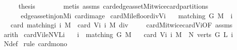 \begin{isabellebody}
%
\isadelimproof
%
\endisadelimproof
%
\isatagproof
{}\isamarkupfalse%
\ {\isacharminus}\isanewline
\ \ \isamarkupfalse%
\ {\isacharquery}thesis\ \ \isanewline
\ \ \ \ \isamarkupfalse%
\ {\isacharparenleft}metis\ assms\ card{\isacharunderscore}edge{\isacharunderscore}as{\isacharunderscore}set{\isacharunderscore}Mi{\isacharunderscore}twice{\isacharunderscore}card{\isacharunderscore}partitions\isanewline
\ \ \ \ \ \ edge{\isacharunderscore}as{\isacharunderscore}set{\isacharunderscore}inj{\isacharunderscore}on{\isacharunderscore}Mi\ card{\isacharunderscore}image{\isacharparenright}\isanewline
{}\isamarkupfalse%
%
\endisatagproof
{\isafoldproof}%
%
\isadelimproof
\isanewline
%
\endisadelimproof
\isanewline
{}\isamarkupfalse%
\ card{\isacharunderscore}Mi{\isacharunderscore}le{\isacharunderscore}floor{\isacharunderscore}div{\isacharunderscore}{}{\isacharunderscore}Vi{\isacharcolon}\isanewline
\ \ \ {\isachardoublequoteopen}matching\ G\ M\ {\isasymand}\ i\ {\isachargreater}\ {}{\isachardoublequoteclose}\isanewline
\ \ \ {\isachardoublequoteopen}card\ {\isacharparenleft}matching{\isacharunderscore}i\ i\ M{\isacharparenright}\ {\isasymle}\ {\isacharparenleft}card\ {\isacharparenleft}V{\isacharunderscore}i\ i\ M{\isacharparenright}{\isacharparenright}\ div\ {}{\isachardoublequoteclose}\isanewline
%
\isadelimproof
\ \ %
\endisadelimproof
%
\isatagproof
{}\isamarkupfalse%
\ card{\isacharunderscore}Mi{\isacharunderscore}twice{\isacharunderscore}card{\isacharunderscore}Vi{\isacharbrackleft}OF\ assms{\isacharbrackright}\isanewline
\ \ \isamarkupfalse%
\ arith%
\endisatagproof
{\isafoldproof}%
%
\isadelimproof
\isanewline
%
\endisadelimproof
\isanewline
{}\isamarkupfalse%
\ card{\isacharunderscore}Vi{\isacharunderscore}le{\isacharunderscore}NVLi{\isacharcolon}\isanewline
\ \ \ {\isachardoublequoteopen}i{\isachargreater}{}\ {\isasymand}\ matching\ G\ M{\isachardoublequoteclose}\isanewline
\ \ \ {\isachardoublequoteopen}card\ {\isacharparenleft}V{\isacharunderscore}i\ i\ M{\isacharparenright}\ {\isasymle}\ N\ {\isacharparenleft}verts\ G{\isacharparenright}\ L\ i{\isachardoublequoteclose}\isanewline
%
\isadelimproof
\ \ %
\endisadelimproof
%
\isatagproof
{}\isamarkupfalse%
\ N{\isacharunderscore}def\isanewline
{}\isamarkupfalse%
\ {\isacharparenleft}rule\ card{\isacharunderscore}mono{\isacharparenright}\isanewline

\end{isabellebody}

